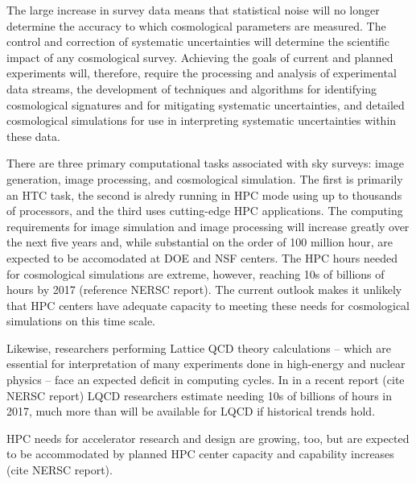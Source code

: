 The large increase in survey data means that statistical noise will no longer determine the accuracy to which cosmological parameters are 
measured. The control and correction of systematic uncertainties will determine the scientific impact of any cosmological survey. 
Achieving the goals of current and planned experiments will, therefore, require the processing and analysis of experimental data streams, 
the development of techniques and algorithms for identifying cosmological signatures and for mitigating systematic uncertainties, 
 and detailed cosmological simulations for use in interpreting systematic uncertainties within these data. 

There are three primary computational tasks associated with sky surveys: image generation, image processing, and cosmological simulation. The first 
is primarily an HTC task, the second is alredy running in HPC mode using up to thousands of processors, and the third uses cutting-edge HPC applications.  The computing requirements for image simulation and image processing will increase greatly over the next five years and, while substantial
on the order of 100 million hour, are expected to be accomodated at DOE and NSF centers. The HPC hours needed for cosmological simulations are extreme, however, reaching 10s of billions of hours by 2017 (reference NERSC report). The current outlook
makes it unlikely that HPC centers have adequate capacity to meeting these needs for cosmological
simulations on this time scale. 
 
Likewise, researchers performing Lattice QCD theory calculations 
-- which are essential for interpretation of many experiments done in high-energy and nuclear physics -- 
face an expected deficit in computing cycles. In in a recent report (cite NERSC report) 
LQCD researchers estimate needing 10s of billions of  hours in 2017, much more than will be available 
for LQCD if historical trends hold.

HPC needs for accelerator research and design are growing, too, but are expected to be accommodated by planned HPC center capacity and capability increases (cite NERSC report). 

